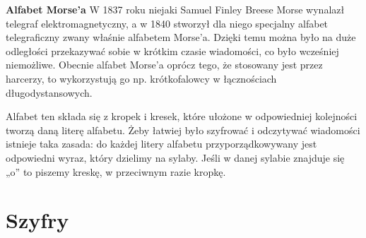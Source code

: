 \textbf{Alfabet Morse’a}
W 1837 roku niejaki Samuel Finley Breese Morse wynalazł telegraf elektromagnetyczny, a w 1840 stworzył dla niego specjalny alfabet telegraficzny zwany właśnie alfabetem Morse’a. 
Dzięki temu można było na duże odległości przekazywać sobie w krótkim czasie wiadomości, co było wcześniej niemożliwe. 
Obecnie alfabet Morse’a oprócz tego, że stosowany jest przez harcerzy, to wykorzystują go np. krótkofalowcy w łącznościach długodystansowych.

Alfabet ten składa się z kropek i kresek, które ułożone w odpowiedniej kolejności tworzą daną literę alfabetu. 
Żeby łatwiej było szyfrować i odczytywać wiadomości istnieje taka zasada: do każdej litery alfabetu przyporządkowywany jest odpowiedni wyraz, który dzielimy na sylaby. 
Jeśli w danej sylabie znajduje się „o” to piszemy kreskę, w przeciwnym razie kropkę.


\section{Szyfry}





